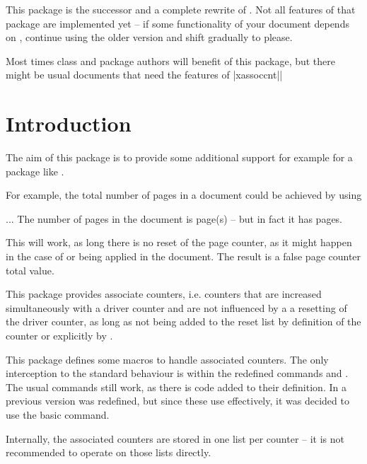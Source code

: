 \documentclass[12pt,a4paper,oneside]{article}
\newcommand{\PackageDocName}{xassoccnt}%
\begin{document}
This package is the successor and a complete rewrite of . Not all features of that package are implemented yet -- if some functionality of your document depends on , continue using the older version and shift gradually to \CHDocPackage{\PackageDocName} please.

\begin{marker}
Most times class and package authors will benefit of this package, but there might be usual documents that need the features of |\PackageDocName||
\end{marker}

\section{Introduction}

The aim of this package is to provide some additional support for example for a package like . 

For example, the total number of pages in a document could be achieved by using

\begin{dispExample}%
...
The number of pages in the document is \number{} page(s) -- but in fact it has  pages. 
\end{dispExample}%

This will work, as long there is no reset of the page counter, as it might happen in the case of  or   being applied in the document. The result is a false page counter total value. 

This package provides associate counters, i.e. counters that are increased simultaneously with a driver counter and are not influenced by a a resetting of the driver counter, as long as not being added to the reset list by definition of the counter or explicitly by . 

This package defines some macros to handle associated counters. The only interception to the standard behaviour is within the redefined commands  and . The usual commands still work, as there is code added to their definition. In a previous version  was redefined, but since these use  effectively, it was decided to use the basic command. 

Internally, the associated counters are stored in one list per counter -- it is not recommended to operate on those lists directly. 
\end{document}

